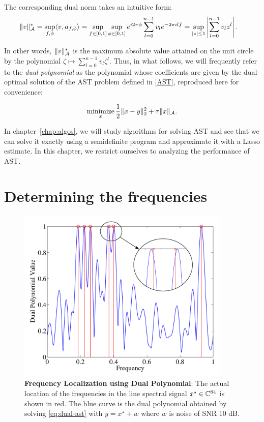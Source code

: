 The corresponding dual norm takes an intuitive form:
\begin{align}
	\|v\|_{\mathcal{A}}^* &= \sup_{{f,\phi}} \langle v, a_{f,\phi} \rangle=\sup_{f\in [0,1]}  \sup_{\phi \in [0,1]}  e^{i 2\pi \phi} \sum_{l=0}^{n-1} v_l e^{-2\pi i l f} =\sup_{ |z|\leq 1 }  \left| \sum_{l=0}^{n-1} v_l z^l\right|.\label{eq:dual-norm-poly}
\end{align}

In other words, $\|v\|_{\mathcal{A}}^*$ is the maximum absolute value attained on the
unit circle by the polynomial $\zeta \mapsto \sum_{l=0}^{n-1} v_l \zeta^l$.
Thus, in what follows, we will frequently refer to the \emph{dual polynomial} as
the polynomial whose coefficients are given by the dual optimal solution of the
AST problem defined in \eqref{AST}, reproduced here for convenience:

\begin{equation}
\label{eq:linespect:ast}
\mathop{\textrm{minimize}}_x \frac{1}{2} \lVert x - y\rVert_2^2 + \tau \lVert x\rVert_{\mathcal{A}}.
\end{equation}

In chapter~\ref{chap:algos}, we will study algorithms for solving AST and see that we can solve it exactly using a semidefinite program and approximate it with a Lasso estimate. In this chapter, we restrict ourselves to analyzing the performance of AST.

\section{Determining the frequencies}
\label{sec:frequency-localize}
\begin{figure}[htp]
\centering
\includegraphics[width=4in]{figures/dual_poly_inset.pdf}
\caption{ \textbf{Frequency Localization using Dual Polynomial}: The
actual location of the frequencies in the line spectral signal $x^\star \in
\mathbb{C}^{64}$ is shown in red. The blue curve is the dual polynomial
obtained by solving \eqref{eq:dual-ast} with $y = x^\star + w$ where $w$ is noise of SNR 10 dB.}

\label{fig:dual_poly_localize}
\end{figure}

